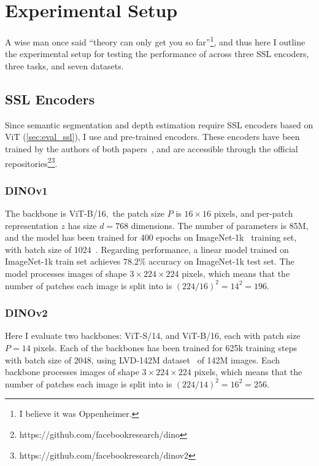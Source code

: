 \chapter{Experimental Setup}\label{chap:exp_setup}

A wise man once said ``theory can only get you so far''\footnote{I believe it was Oppenheimer.}, and thus here I outline the experimental setup for testing the performance of \EmbedAttack across three SSL encoders, three tasks, and seven datasets.

\section{SSL Encoders}

Since semantic segmentation and depth estimation require SSL encoders based on ViT (\cref{sec:eval_ssl}), I use \DINOvone and \DINOvtwo pre-trained encoders. These encoders have been trained by the authors of both papers~\cite{dinov1,dinov2}, and are accessible through the official repositories\footnote{https://github.com/facebookresearch/dino}\footnote{https://github.com/facebookresearch/dinov2}.

\subsection{DINOv1}

The backbone is ViT-B/16,~\ie the patch size $P$ is $16\times 16$ pixels, and per-patch representation $z$ has size $d=768$ dimensions. The number of parameters is 85M, and the model has been trained for 400 epochs on ImageNet-1k~\cite{imagenet} training set, with batch size of 1024~\cite{dinov1}. Regarding performance, a linear model trained on ImageNet-1k train set achieves $78.2\%$ accuracy on ImageNet-1k test set. The model processes images of shape $3\times224\times224$ pixels, which means that the number of patches each image is split into is $(224/16)^2=14^2=196$.

\subsection{DINOv2}

Here I evaluate two backbones: ViT-S/14, and ViT-B/16, each with patch size $P=14$ pixels. Each of the backbones has been trained for 625k training steps with batch size of 2048, using LVD-142M dataset~\cite{dinov2} of 142M images. Each backbone processes images of shape $3\times224\times224$ pixels, which means that the number of patches each image is split into is $(224/14)^2=16^2=256$.
